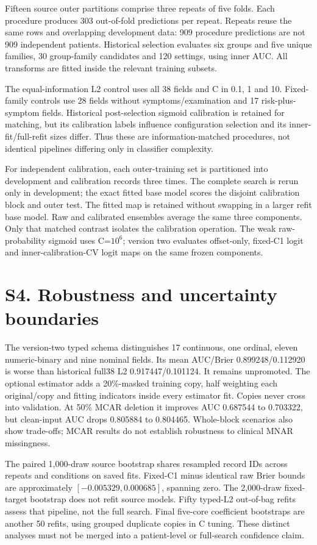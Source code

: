 \documentclass[10pt]{article}
\let\originalsection\section
\renewcommand\section{\Needspace{6\baselineskip}\originalsection}
\begin{document}
Fifteen source outer partitions comprise three repeats of five folds. Each procedure produces 303 out-of-fold predictions per repeat. Repeats reuse the same rows and overlapping development data: 909 procedure predictions are not 909 independent patients. Historical selection evaluates six groups and five unique families, 30 group-family candidates and 120 settings, using inner AUC. All transforms are fitted inside the relevant training subsets.

The equal-information L2 control uses all 38 fields and C in 0.1, 1 and 10. Fixed-family controls use 28 fields without symptoms/examination and 17 risk-plus-symptom fields. Historical post-selection sigmoid calibration is retained for matching, but its calibration labels influence configuration selection and its inner-fit/full-refit sizes differ. Thus these are information-matched procedures, not identical pipelines differing only in classifier complexity.

For independent calibration, each outer-training set is partitioned into development and calibration records three times. The complete search is rerun only in development; the exact fitted base model scores the disjoint calibration block and outer test. The fitted map is retained without swapping in a larger refit base model. Raw and calibrated ensembles average the same three components. Only that matched contrast isolates the calibration operation. The weak raw-probability sigmoid uses C=$10^6$; version two evaluates offset-only, fixed-C1 logit and inner-calibration-CV logit maps on the same frozen components.

\section*{S4. Robustness and uncertainty boundaries}
The version-two typed schema distinguishes 17 continuous, one ordinal, eleven numeric-binary and nine nominal fields. Its mean AUC/Brier 0.899248/0.112920 is worse than historical full38 L2 0.917447/0.101124. It remains unpromoted. The optional estimator adds a 20\%-masked training copy, half weighting each original/copy and fitting indicators inside every estimator fit. Copies never cross into validation. At 50\% MCAR deletion it improves AUC 0.687544 to 0.703322, but clean-input AUC drops 0.805884 to 0.804465. Whole-block scenarios also show trade-offs; MCAR results do not establish robustness to clinical MNAR missingness.

The paired 1,000-draw source bootstrap shares resampled record IDs across repeats and conditions on saved fits. Fixed-C1 minus identical raw Brier bounds are approximately $[-0.005329,0.000685]$, spanning zero. The 2,000-draw fixed-target bootstrap does not refit source models. Fifty typed-L2 out-of-bag refits assess that pipeline, not the full search. Final five-core coefficient bootstraps are another 50 refits, using grouped duplicate copies in C tuning. These distinct analyses must not be merged into a patient-level or full-search confidence claim.
\end{document}
